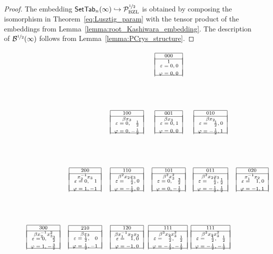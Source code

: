 \documentclass[11pt]{article}
\begin{document}
\begin{proof}
The embedding $ \mathsf{SetTab}_n(\infty) \hookrightarrow \mathcal{P}^{\nicefrac{1}{2}}_{\mathrm{BZL}}$ is obtained by composing the isomorphism in Theorem~\ref{eq:Lusztig_param} with the tensor product of the embeddings from Lemma~\ref{lemma:root_Kashiwara_embedding}.
The description of $\mathcal{B}^{\nicefrac{1}{2}}(\infty)$ follows from Lemma~\ref{lemma:PCrys_structure}.
\end{proof}


\begin{figure}[t]
\newcommand{\tikzElem}[8]{{\scriptsize\begin{tabular}{|c|}  \hline $#1 #2 #3$ \\  \hline    $ #4$ \\[-10pt]\\  $\ba \varepsilon &= {#5} ,&\hspace{-3mm} {#7} \\ \varphi &={#6},&\hspace{-3mm} {#8}\ea$ \\[-10pt]  \\ \hline \end{tabular}}}
\[
    \begin{tikzpicture}[xscale=2.1, yscale=2.9,>=latex]%
\node at (0,0) (A1) {$\tikzElem{0}{0}{0}{1}{0}{0}{0}{0}$};
%
\node at (-1,-1) (A2) {$\tikzElem{1}{0}{0}{\beta x_3}{0}{0}{\tfrac{1}{2}}{-\tfrac{1}{2}}$};
\node at (0,-1) (B2) {$\tikzElem{0}{0}{1}{\beta x_3}{0}{0}{1}{0}$};
\node at (1,-1) (C2) {$\tikzElem{0}{1}{0}{\beta x_2}{\phantom{-}\tfrac{1}{2}}{-\tfrac{1}{2}}{0}{1}$};
%
\node at (-2,-2) (A3) {$\tikzElem{2}{0}{0}{x_2^{-1}x_3}{0}{1}{1}{-1}$};
\node at (-1,-2) (B3) {$\tikzElem{1}{1}{0}{\beta^2x_2x_3}{\phantom{-}\tfrac{1}{2}}{-\tfrac{1}{2}}{0}{0}$};
\node at (0,-2) (C3) {$\tikzElem{1}{0}{1}{\beta^2x_3^2}{0}{0}{\tfrac{3}{2}}{-\tfrac{1}{2}}$};
\node at (1,-2) (D3) {$\tikzElem{0}{1}{1}{\beta^2x_2x_3}{\phantom{-}\tfrac{1}{2}}{-\tfrac{1}{2}}{\tfrac{1}{2}}{\tfrac{1}{2}}$};
\node at (2,-2) (E3) {$\tikzElem{0}{2}{0}{x_1^{-1}x_2}{\phantom{-}1}{-1}{0}{1}$};
%
\node at (-2,-3) (A4) {$\tikzElem{2}{1}{0}{\beta x_3}{\tfrac{1}{2}}{\tfrac{1}{2}}{0}{-1}$};
\node at (-3,-3) (B4) {$\tikzElem{3}{0}{0}{\beta x_2^{-1}x_3^2}{0}{1}{\tfrac{3}{2}}{-\tfrac{3}{2}}$};
\node at (-1,-3) (C4) {$\tikzElem{1}{2}{0}{\beta x_1^{-1}x_2x_3}{\phantom{-}1}{-1}{0}{0}$};
\node at (-0.02,-3) (D4) {$\tikzElem{1}{1}{1}{\beta^3 x_2x_3^2}{\phantom{-}\tfrac{1}{2}}{-\tfrac{1}{2}}{\tfrac{1}{2}}{-\tfrac{1}{2}}$};
\node at (1,-3) (H4) {$\tikzElem{1}{1}{1}{\beta^3 x_2x_3^2}{\phantom{-}\tfrac{1}{2}}{-\tfrac{1}{2}}{\tfrac{1}{2}}{-\tfrac{1}{2}}$};

\end{tikzpicture}\]
\end{figure}
\end{document}
